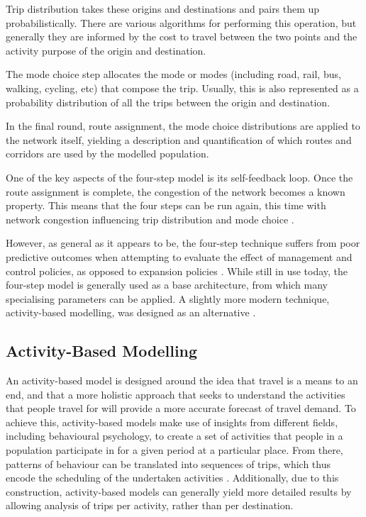 Trip distribution takes these origins and destinations and pairs them up probabilistically. There are various algorithms for performing this operation, but generally they are informed by the cost to travel between the two points and the activity purpose of the origin and destination.

The mode choice step allocates the mode or modes (including road, rail, bus, walking, cycling, etc) that compose the trip. Usually, this is also represented as a probability distribution of all the trips between the origin and destination.

In the final round, route assignment, the mode choice distributions are applied to the network itself, yielding a description and quantification of which routes and corridors are used by the modelled population.

One of the key aspects of the four-step model is its self-feedback loop. Once the route assignment is complete, the congestion of the network becomes a known property. This means that the four steps can be run again, this time with network congestion influencing trip distribution and mode choice \cite{mcnallyFourStepModel2007}.

However, as general as it appears to be, the four-step technique suffers from poor predictive outcomes when attempting to evaluate the effect of management and control policies, as opposed to expansion policies \cite{mcnallyFourStepModel2007}. While still in use today, the four-step model is generally used as a base architecture, from which many specialising parameters can be applied. A slightly more modern technique, activity-based modelling, was designed as an alternative \cite{mcnallyActivityBasedApproach2007}.

\subsection{Activity-Based Modelling}
An activity-based model is designed around the idea that travel is a means to an end, and that a more holistic approach that seeks to understand the activities that people travel for will provide a more accurate forecast of travel demand. To achieve this, activity-based models make use of insights from different fields, including behavioural psychology, to create a set of activities that people in a population participate in for a given period at a particular place. From there, patterns of behaviour can be translated into sequences of trips, which thus encode the scheduling of the undertaken activities \cite{mcnallyActivityBasedApproach2007}. Additionally, due to this construction, activity-based models can generally yield more detailed results by allowing analysis of trips per activity, rather than per destination.

